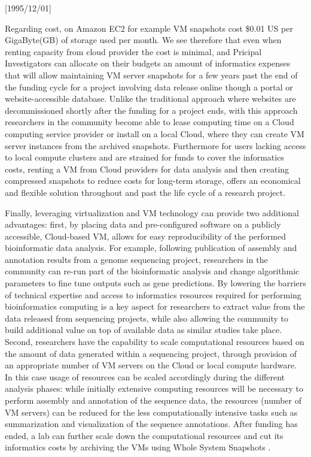 \NeedsTeXFormat{LaTeX2e}[1995/12/01] \documentclass[10pt]{bmc_article}
\newenvironment{bmcformat}{\begin{raggedright}\baselineskip20pt\sloppy\setboolean{publ}{false}}{\end{raggedright}\baselineskip20pt\sloppy}
\begin{document}
\begin{bmcformat}
Regarding cost, on Amazon EC2 for example VM snapshots cost \$0.01 US per GigaByte(GB) of storage used 
per month. We see therefore that even when renting capacity from cloud provider the cost is minimal, 
and Pricipal Investigators can allocate on their budgets an amount of informatics expenses that will 
allow maintaining VM server snapshots for a few years past the end of the funding cycle for a project 
involving data release online though a portal or website-accessible database. Unlike the traditional 
approach where websites are decommissioned shortly
after the funding for a project ends, with this approach researchers in the community become able to 
lease computing time on a Cloud computing service provider or install on a local Cloud, where they
can create VM server instances from the archived snapshots. Furthermore for users lacking access to 
local compute clusters and are strained for funds to cover the informatics costs, renting a VM from 
Cloud providers for data analysis and then creating compressed snapshots to reduce costs for long-term 
storage, offers an economical and flexible solution throughout and past the life cycle of a research project.

Finally, leveraging virtualization and VM technology can provide two additional advantages: first, 
by placing data and pre-configured software on a publicly accessible, Cloud-based VM, allows for easy 
reproducibility of the performed bioinformatic data analysis. For example, following publication of 
assembly and annotation results from a genome sequencing project, researchers in the community can re-run
part of the bioinformatic analysis and change algorithmic parameters to fine tune outputs such as 
gene predictions. By lowering the barriers of technical expertise and access to informatics resources 
required for performing bioinformatics computing is a key aspect for researchers to extract value 
from the data released from sequencing projects, while also allowing the community to build additional 
value on top of available data as similar studies take place. Second, researchers have the capability 
to scale computational resources based on the amount of data generated within a sequencing project, 
through provision of an appropriate number of VM servers on the Cloud or local compute hardware. In this
case usage of resources can be scaled accordingly during the different analysis phases: while 
initially extensive computing resources will be necessary to perform assembly and annotation of the sequence 
data, the resources (number of VM servers) can be reduced for the less computationally intensive tasks such 
as summarization and visualization of the sequence annotations. After funding has ended, a lab can further 
scale down the computational resources and cut its informatics costs by archiving the VMs using Whole 
System Snapshots \cite{Dudley2010}.




\end{bmcformat}
\end{document}
